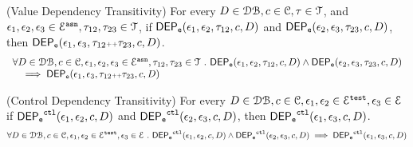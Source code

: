%
%
\begin{thm}
	\label{lem:valdep_trans}
(Value Dependency Transitivity)
For every $D \in \dbdom , c \in \cdom, \trace \in \mathcal{T}$, and $\event_1, \event_2, \event_3 \in \eventset^{\asn}, \trace_{12}, \trace_{23} \in \mathcal{T}$,
if $\eventdep(\event_1, \event_2, \trace_{12}, c, D)$
and $\eventdep(\event_2, \event_3, \trace_{23}, c, D) $,
then $\eventdep(\event_1, \event_3, \trace_{12}\tracecat\trace_{23}, c, D)$.
  \[
	  \begin{array}{l}
  \forall D \in \dbdom , c \in \cdom, \event_1, \event_2, \event_3 \in \eventset^{\asn}, \trace_{12}, \trace_{23} \in \mathcal{T} \st 
  \eventdep(\event_1, \event_2, \trace_{12}, c, D) 
  \land
  \eventdep(\event_2, \event_3, \trace_{23}, c, D) 
  \\ \quad
  \implies
  \eventdep(\event_1, \event_3, \trace_{12}\tracecat\trace_{23}, c, D)
	  \end{array}
  \]
\end{thm}
%
%
\begin{lem}(Control Dependency Transitivity)
\label{lem:ctl_trans}
For every $D \in \dbdom , c \in \cdom, \event_1, \event_2 \in \eventset^{\test}, \event_3 \in \eventset$
if $\eventdep^{\ctl}(\event_1, \event_2, c, D)$ and $\eventdep^{\ctl}(\event_2, \event_3, c, D)$,
then $\eventdep^{\ctl}(\event_1, \event_3, c, D)$.
%
\[
  \forall D \in \dbdom , c \in \cdom, \event_1, \event_2 \in \eventset^{\test}, \event_3 \in \eventset \st
  \eventdep^{\ctl}(\event_1, \event_2, c, D) 
  \land \eventdep^{\ctl}(\event_2, \event_3, c, D)
  \implies \eventdep^{\ctl}(\event_1, \event_3, c, D)
\]
\end{lem}
